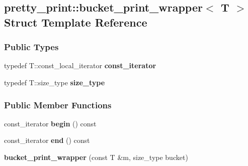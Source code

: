 \hypertarget{structpretty__print_1_1bucket__print__wrapper}{}\subsection{pretty\+\_\+print\+:\+:bucket\+\_\+print\+\_\+wrapper$<$ T $>$ Struct Template Reference}
\label{structpretty__print_1_1bucket__print__wrapper}
\subsubsection*{Public Types}
\begin{DoxyCompactItemize}
\item 
typedef T\+::const\+\_\+local\+\_\+iterator {\bfseries const\+\_\+iterator}\hypertarget{structpretty__print_1_1bucket__print__wrapper_a85cd98546bf5f984e1ef166fec5bcf51}{}\label{structpretty__print_1_1bucket__print__wrapper_a85cd98546bf5f984e1ef166fec5bcf51}

\item 
typedef T\+::size\+\_\+type {\bfseries size\+\_\+type}\hypertarget{structpretty__print_1_1bucket__print__wrapper_aa503d5f19dde02fb04cda38ef3855478}{}\label{structpretty__print_1_1bucket__print__wrapper_aa503d5f19dde02fb04cda38ef3855478}

\end{DoxyCompactItemize}
\subsubsection*{Public Member Functions}
\begin{DoxyCompactItemize}
\item 
const\+\_\+iterator {\bfseries begin} () const \hypertarget{structpretty__print_1_1bucket__print__wrapper_aa2a1e4ca0cbaf9e3d60ccc945341b29d}{}\label{structpretty__print_1_1bucket__print__wrapper_aa2a1e4ca0cbaf9e3d60ccc945341b29d}

\item 
const\+\_\+iterator {\bfseries end} () const \hypertarget{structpretty__print_1_1bucket__print__wrapper_a09acc5752732065ef269a88706460eb1}{}\label{structpretty__print_1_1bucket__print__wrapper_a09acc5752732065ef269a88706460eb1}

\item 
{\bfseries bucket\+\_\+print\+\_\+wrapper} (const T \&m, size\+\_\+type bucket)\hypertarget{structpretty__print_1_1bucket__print__wrapper_ab255d8aa44b65ccb9a1811cfcab3317e}{}\label{structpretty__print_1_1bucket__print__wrapper_ab255d8aa44b65ccb9a1811cfcab3317e}

\end{DoxyCompactItemize}
